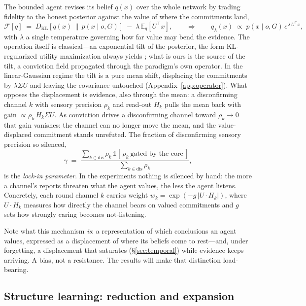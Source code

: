 \documentclass[runningheads]{llncs}
\newcommand{\KL}[2]{D_{\mathrm{KL}}\!\left[#1\,\middle\|\,#2\right]}
\newcommand{\Eq}[2]{\mathbb{E}_{#1}\!\left[#2\right]}
\begin{document}
The bounded agent revises its belief $q(x)$ over the whole network by trading fidelity to the honest
posterior against the value of where the commitments land,
\begin{equation}
\mathcal{F}[q]\;=\;\KL{q(x)}{p(x\mid o,G)}\;-\;\lambda\,\Eq{q}{U^{\!\top}\!x},
\qquad\Longrightarrow\qquad
q_\lambda(x)\;\propto\;p(x\mid o,G)\,e^{\lambda\,U^{\!\top}\!x},
\label{eq:tilted}
\end{equation}
with $\lambda$ a single temperature governing how far value may bend the evidence. The operation
itself is classical---an exponential tilt of the posterior, the form KL-regularized utility
maximization always yields \citep{todorov2009,ortega2013}; what is ours is the source of the tilt, a
conviction field propagated through the paradigm's own operator. In the linear-Gaussian regime the
tilt is a pure mean shift, displacing the commitments by $\lambda\Sigma U$ and leaving the
covariance untouched (Appendix~\ref{app:operator}). What opposes the displacement is
evidence, also through the mean: a disconfirming channel $k$ with sensory precision $\rho_k$ and
read-out $H_k$ pulls the mean back with gain $\propto\rho_k\,H_k\Sigma U$. As conviction drives a
disconfirming channel toward $\rho_k\to0$ that gain vanishes: the channel can no longer move the
mean, and the value-displaced commitment stands unrefuted. The fraction of disconfirming sensory
precision so silenced,
\begin{equation}
\gamma\;=\;\frac{\sum_{k\in\mathrm{dis}}\rho_k\,\mathbb{1}[\,\rho_k\ \text{gated by the core}\,]}
{\sum_{k\in\mathrm{dis}}\rho_k},
\label{eq:gamma}
\end{equation}
is the \emph{lock-in parameter}. In the experiments nothing is silenced by hand: the more a
channel's reports threaten what the agent values, the less the agent listens. Concretely, each
round channel $k$ carries weight $w_k=\exp(-g\,|U\!\cdot\!H_k|)$, where $U\!\cdot\!H_k$ measures
how directly the channel bears on valued commitments and $g$ sets how strongly caring becomes
not-listening.

Note what this mechanism \emph{is}: a representation of which conclusions an agent values,
expressed as a displacement of where its beliefs come to rest---and, under forgetting, a
displacement that saturates (\S\ref{sec:temporal}) while evidence keeps arriving. A bias, not a
resistance. The results will make that distinction load-bearing.

\subsection{Structure learning: reduction and expansion}
\label{sec:structurelearning}
\end{document}
